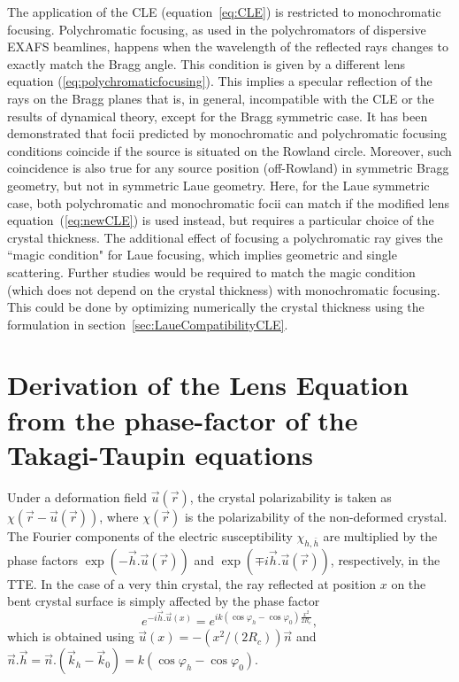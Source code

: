 \documentclass[preprint]{iucr}              %
\begin{document}
The application of the CLE (equation~\ref{eq:CLE}) is restricted to monochromatic focusing. Polychromatic focusing, as used in the polychromators of dispersive EXAFS beamlines, happens when the wavelength of the reflected rays changes to exactly match the Bragg angle. This condition is given by a different lens equation (\ref{eq:polychromaticfocusing}). This implies a specular reflection of the rays on the Bragg planes that is, in general, incompatible with the CLE or the results of dynamical theory, except for the Bragg symmetric case. It has been demonstrated that focii predicted by monochromatic and polychromatic focusing conditions coincide if the source is situated on the Rowland circle. Moreover, such coincidence is also true for any source position (off-Rowland) in symmetric Bragg geometry, but not in symmetric Laue geometry. Here, for the Laue symmetric case, both polychromatic and monochromatic focii can match if the modified lens equation~(\ref{eq:newCLE}) is used instead, but requires a particular choice of the crystal thickness.
The additional effect of focusing a polychromatic ray \cite{PengQi2021} gives the ``magic condition"  for Laue focusing, which implies geometric and single scattering. Further studies would be required to match the magic condition (which does not depend on the crystal thickness) with monochromatic focusing. This could be done by optimizing numerically the crystal thickness using the formulation in section~\ref{sec:LaueCompatibilityCLE}.






\appendix
\section{Derivation of the Lens Equation from the phase-factor of the Takagi-Taupin equations}
\label{appendix:CLE}

Under a deformation field $\vec u(\vec r)$, the crystal polarizability is taken as 
$\chi(\vec r-\vec u(\vec r))$, where $\chi(\vec r)$ is the
polarizability of the non-deformed crystal. The Fourier components of the electric susceptibility $\chi_{h,\bar h}$ are multiplied by the phase factors $\exp(-  \vec h . \vec u (\vec r))$ and $\exp(\mp i \vec h . \vec u (\vec r))$, respectively, in the TTE.
In the case of a very thin crystal, the ray reflected at position $x$ on the bent crystal surface is simply affected by the phase factor 
\begin{equation}
    \label{eq:phasefactor11}
    e^{-i \vec h . \vec u(x)} = e^{i k (\cos\varphi_h-\cos\varphi_0) \frac{x^2}{2 R_c} },
\end{equation}
which is obtained using $\vec u(x) = -(x^2/(2R_c))\vec n$ and $\vec n . \vec h = \vec n.(\vec k_h - \vec k_0) = k(\cos\varphi_h-\cos\varphi_0)$. 
\end{document}
